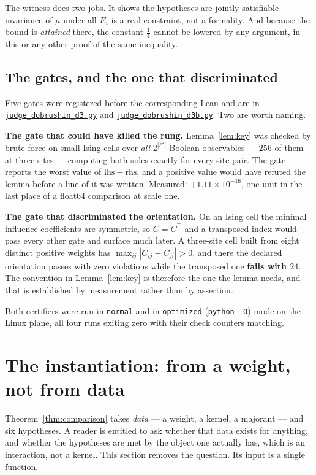 \documentclass[11pt]{article}
\theoremstyle{definition}
\newcommand{\anchor}{c7b870b05bd6d1bec270d499e1358a64070ce0e1}
\newcommand{\repofile}[2]{%
  \href{https://github.com/lluiseriksson/THE-ERIKSSON-PROGRAMME/blob/\anchor/#1}{\nolinkurl{#2}}}
\begin{document}
The witness does two jobs.  It shows the hypotheses are jointly satisfiable ---
invariance of $\mu$ under all $E_i$ is a real constraint, not a formality.  And
because the bound is \emph{attained} there, the constant $\tfrac14$ cannot be
lowered by any argument, in this or any other proof of the same inequality.

\subsection{The gates, and the one that discriminated}

Five gates were registered before the corresponding Lean and are in
\repofile{scripts/judge\_dobrushin\_d3.py}{judge\_dobrushin\_d3.py} and
\repofile{scripts/judge\_dobrushin\_d3b.py}{judge\_dobrushin\_d3b.py}.  Two are
worth naming.

\textbf{The gate that could have killed the rung.}  Lemma~\ref{lem:key} was
checked by brute force on small Ising cells over \emph{all} $2^{|S^{\iota}|}$
Boolean observables --- $256$ of them at three sites --- computing both sides
exactly for every site pair.  The gate reports the worst value of
$\mathrm{lhs}-\mathrm{rhs}$, and a positive value would have refuted the lemma
before a line of it was written.  Measured: $+1.11\times10^{-16}$, one unit in
the last place of a float64 comparison at scale one.

\textbf{The gate that discriminated the orientation.}  On an Ising cell the
minimal influence coefficients are symmetric, so $C=C^{\!\top}$ and a
transposed index would pass every other gate and surface much later.  A
three-site cell built from eight distinct positive weights has
$\max_{ij}|C_{ij}-C_{ji}|>0$, and there the declared orientation passes with
zero violations while the transposed one \textbf{fails with $24$}.  The
convention in Lemma~\ref{lem:key} is therefore the one the lemma needs, and
that is established by measurement rather than by assertion.

Both certifiers were run in \texttt{normal} and in \texttt{optimized}
(\texttt{python -O}) mode on the Linux plane, all four runs exiting zero with
their check counters matching.

\section{The instantiation: from a weight, not from data}
\label{sec:gibbs}

Theorem~\ref{thm:comparison} takes \emph{data} --- a weight, a kernel, a
majorant --- and six hypotheses.  A reader is entitled to ask whether that data
exists for anything, and whether the hypotheses are met by the object one
actually has, which is an interaction, not a kernel.  This section removes the
question.  Its input is a single function.
\end{document}
